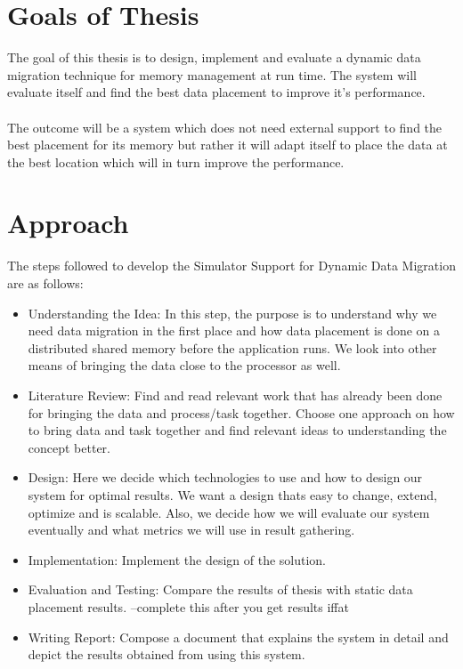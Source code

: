 \documentclass{listhesis}
\begin{document}
\section{Goals of Thesis}
The goal of this thesis is to design, implement and evaluate a dynamic data migration technique for memory management at run time. The system will evaluate itself and find the best data placement to improve it's performance. \\
\\
The outcome will be a system which does not need external support to find the best placement for its memory but rather it will adapt itself to place the data at the best location which will in turn improve the performance. 
\section{Approach}
The steps followed to develop the Simulator Support for Dynamic Data Migration are as follows:
\begin{itemize}
  \item Understanding the Idea: In this step, the purpose is to understand why we need data migration in the first place and how data placement is done on a distributed shared memory before the application runs. We look into other means of bringing the data close to the processor as well. 
  \item Literature Review: Find and read relevant work that has already been done for bringing the data and process/task together. Choose one approach on how to bring data and task together and find relevant ideas to understanding the concept better. 
  \item Design: Here we decide which technologies to use and how to design our system for optimal results. We want a design thats easy to change, extend, optimize and is scalable. Also, we decide how we will evaluate our system eventually and what metrics we will use in result gathering. 
  \item Implementation: Implement the design of the solution. 
  \item Evaluation and Testing: Compare the results of thesis with static data placement results. --complete this after you get results iffat
  \item Writing Report: Compose a document that explains the system in detail and depict the results obtained from using this system.
\end{itemize}
\end{document}

